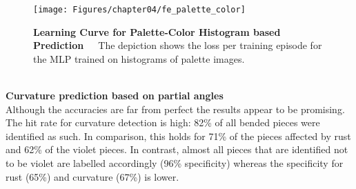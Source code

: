 \begin{figure}[h]
	\centering
	\texttt{[image: Figures/chapter04/fe\_palette\_color]}
	\decoRule
	\caption[Learning Curve for Palette-Color Histogram based Prediction]{\textbf{Learning Curve for Palette-Color Histogram based Prediction}~~~The depiction shows the loss per training episode for the MLP trained on histograms of palette images.}
	\label{fig:FeatureEngineeringPaletteColor}
\end{figure}
\\
\textbf{Curvature prediction based on partial angles} \\
Although the accuracies are far from perfect the results appear to be promising. The hit rate for curvature detection is high: 82\% of all bended pieces were identified as such. In comparison, this holds for 71\% of the pieces affected by rust and 62\% of the violet pieces. In contrast, almost all pieces that are identified not to be violet are labelled accordingly (96\% specificity) whereas the specificity for rust (65\%) and curvature (67\%) is lower.

\begin{table}[h]
	\centering
	\caption[??]{\textbf{??}~~~??}
	\label{tab:}
\end{table}

